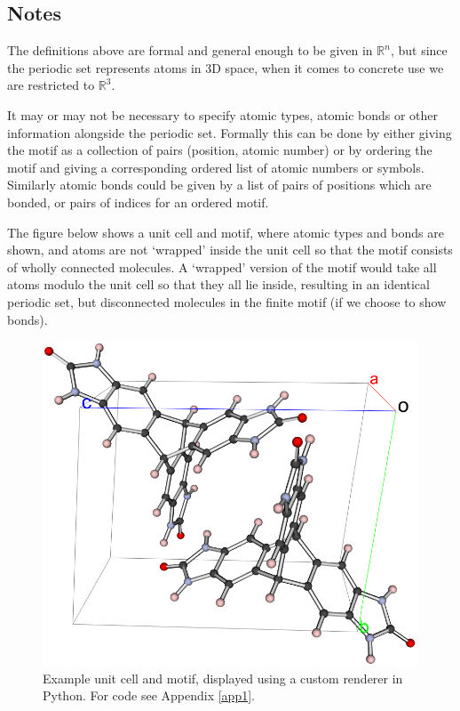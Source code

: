 \documentclass[11pt]{article}
\theoremstyle{definition}
\begin{document}
\subsection{Notes}

The definitions above are formal and general enough to be given in $\mathbb{R}^n$, but since the periodic set represents atoms in 3D space, when it comes to concrete use we are restricted to $\mathbb{R}^3$. 

It may or may not be necessary to specify atomic types, atomic bonds or other information alongside the periodic set. Formally this can be done by either giving the motif as a collection of pairs (position, atomic number) or by ordering the motif and giving a corresponding ordered list of atomic numbers or symbols. Similarly atomic bonds could be given by a list of pairs of positions which are bonded, or pairs of indices for an ordered motif.

The figure below shows a unit cell and motif, where atomic types and bonds are shown, and atoms are not `wrapped' inside the unit cell so that the motif consists of wholly connected molecules. A `wrapped' version of the motif would take all atoms modulo the unit cell so that they all lie inside, resulting in an identical periodic set, but disconnected molecules in the finite motif (if we choose to show bonds).

\begin{figure}[h]
\centering
\includegraphics[scale=0.33]{example.png}
\caption{Example unit cell and motif, displayed using a custom renderer in Python. For code see Appendix \ref{app1}.}
\end{figure}
\end{document}
